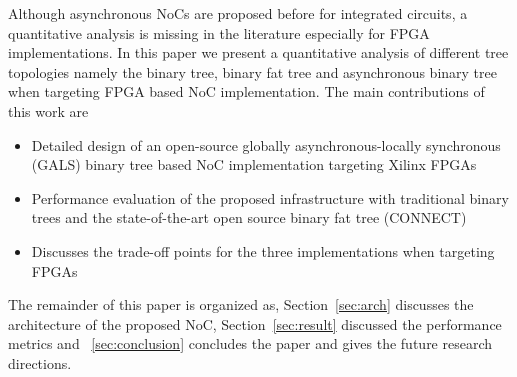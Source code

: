 Although asynchronous NoCs are proposed before for integrated circuits, a quantitative analysis is missing in the literature especially for FPGA implementations.
In this paper we present a quantitative analysis of different tree topologies namely the binary tree, binary fat tree and asynchronous binary tree when targeting FPGA based NoC implementation. 
The main contributions of this work are
\begin{itemize}
\item Detailed design of an open-source globally asynchronous-locally synchronous (GALS) binary tree based NoC implementation targeting Xilinx FPGAs
\item Performance evaluation of the proposed infrastructure with traditional binary trees and the state-of-the-art open source binary fat tree (CONNECT)
\item Discusses the trade-off points for the three implementations when targeting FPGAs
\end{itemize}
The remainder of this paper is organized as, Section~\ref{sec:arch} discusses the architecture of the proposed NoC, Section~\ref{sec:result} discussed the performance metrics and ~\ref{sec:conclusion} concludes the paper and gives the future research directions.